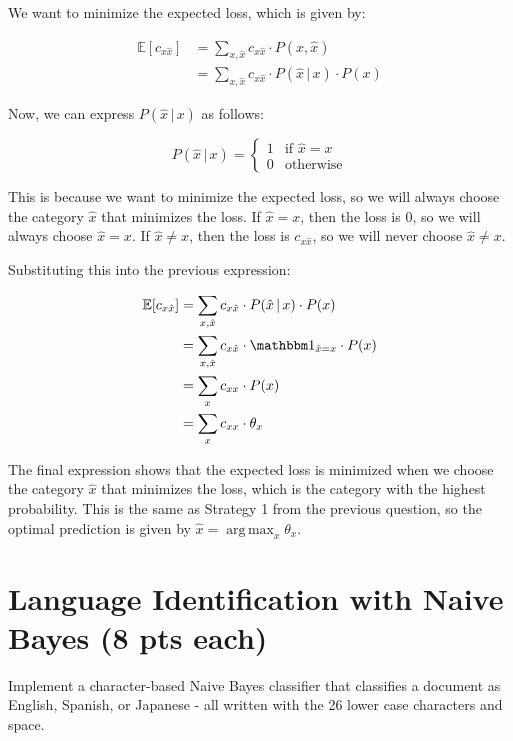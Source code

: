 \documentclass[a4paper]{article}
\theoremstyle{definition}
\DeclareMathOperator*{\argmax}{arg\,max}
\def\E{\mathbb E}
\def\ind{\mathbbm 1}
\newenvironment{soln}{
    \leavevmode\color{blue}\ignorespaces
}{}
\begin{document}
\begin{soln}
    We want to minimize the expected loss, which is given by:

    \[
    \begin{align*}
    \E[c_{x \hat x}] &= \sum_{x, \hat x} c_{x \hat x} \cdot P(x, \hat x) \\
    &= \sum_{x, \hat x} c_{x \hat x} \cdot P(\hat x \,|\, x) \cdot P(x)
    \end{align*}
    \]

    Now, we can express $P(\hat x \,|\, x)$ as follows:

    \[
    P(\hat x \,|\, x) = 
    \begin{cases}
    1 & \text{if } \hat x = x \\
    0 & \text{otherwise}
    \end{cases}
    \]

    This is because we want to minimize the expected loss, so we will always choose the category $\hat x$ that minimizes the loss. If $\hat x = x$, then the loss is 0, so we will always choose $\hat x = x$. If $\hat x \neq x$, then the loss is $c_{x \hat x}$, so we will never choose $\hat x \neq x$.

    Substituting this into the previous expression:

    \[
    \begin{align*}
    \E[c_{x \hat x}] &= \sum_{x, \hat x} c_{x \hat x} \cdot P(\hat x \,|\, x) \cdot P(x) \\
    &= \sum_{x, \hat x} c_{x \hat x} \cdot \ind_{\hat x = x} \cdot P(x) \\
    &= \sum_{x} c_{x x} \cdot P(x) \\
    &= \sum_{x} c_{x x} \cdot \theta_x
    \end{align*}
    \]

    The final expression shows that the expected loss is minimized when we choose the category $\hat x$ that minimizes the loss, which is the category with the highest probability. This is the same as Strategy 1 from the previous question, so the optimal prediction is given by $\hat x = \argmax_x \theta_x$.
\end{soln}


\section{Language Identification with Naive Bayes (8 pts each)}
Implement a character-based Naive Bayes classifier that classifies a document as English, Spanish, or Japanese - all written with the 26 lower case characters and space.
\end{document}
